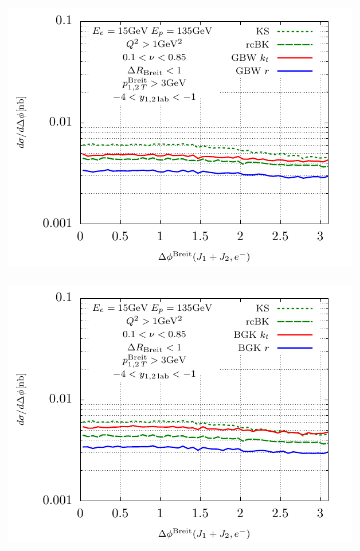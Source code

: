 \documentclass[12pt]{article}
\numberwithin{equation}{section}
\numberwithin{table}{section}
\numberwithin{figure}{section}
\begin{document}
\begin{figure}[p]
	\begin{subfigure}{0.5\textwidth}
	\includegraphics[width=\textwidth]{plots/plotGBW1} 
	\end{subfigure}
	\begin{subfigure}{0.5\textwidth}
	\includegraphics[width=\textwidth]{plots/plotBGK1} 
	\end{subfigure}
	\begin{subfigure}{0.5\textwidth}

\end{subfigure}
\end{figure}
\end{document}
